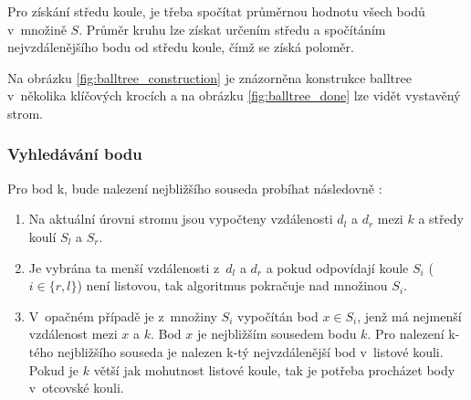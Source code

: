 

Pro získání středu koule, je třeba spočítat průměrnou hodnotu všech bodů v~množině $S$. Průměr kruhu lze získat určením středu a spočítáním nejvzdálenějšího bodu od středu koule, čímž se získá poloměr.

Na obrázku \ref{fig:balltree_construction} je znázorněna konstrukce balltree v~několika klíčových krocích a na obrázku \ref{fig:balltree_done} lze vidět vystavěný strom. 

\subsubsection{Vyhledávání bodu}
Pro bod k, bude nalezení nejbližšího souseda probíhat následovně \cite{balltree}:
\begin{enumerate}
\item Na aktuální úrovni stromu jsou vypočteny vzdálenosti $d_l$ a $d_r$ mezi $k$ a středy koulí $S_l$ a $S_r$.
\item Je vybrána ta menší vzdálenosti z~$d_l$ a $d_r$ a pokud odpovídají koule $S_i$ ($i \in \{r,l\}$) není listovou, tak algoritmus pokračuje nad množinou $S_i$.
\item V~opačném případě je z~množiny $S_i$ vypočítán bod $x \in S_i$, jenž má nejmenší vzdálenost mezi $x$ a $k$. Bod $x$ je nejbližším sousedem bodu $k$. Pro nalezení k-tého nejbližšího souseda je nalezen k-tý nejvzdálenější bod v~listové kouli. Pokud je $k$ větší jak mohutnost listové koule, tak je potřeba procházet body v~otcovské kouli.
\end{enumerate}

